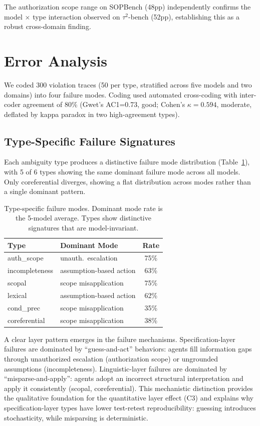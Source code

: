 \documentclass[11pt,a4paper]{article}
\begin{document}
The authorization scope range on SOPBench (48pp) independently confirms the model $\times$ type interaction observed on $\tau^2$-bench (52pp), establishing this as a robust cross-domain finding.

\section{Error Analysis}
\label{sec:error}

We coded 300 violation traces (50 per type, stratified across five models and two domains) into four failure modes. Coding used automated cross-coding with inter-coder agreement of 80\% (Gwet's AC1=0.73, good; Cohen's $\kappa=0.594$, moderate, deflated by kappa paradox in two high-agreement types).

\subsection{Type-Specific Failure Signatures}

Each ambiguity type produces a distinctive failure mode distribution (Table~\ref{tab:failure_modes}), with 5 of 6 types showing the same dominant failure mode across all models. Only coreferential diverges, showing a flat distribution across modes rather than a single dominant pattern.

\begin{table}[t]
\centering
\small
\caption{Type-specific failure modes. Dominant mode rate is the 5-model average. Types show distinctive signatures that are model-invariant.}
\label{tab:failure_modes}
\begin{tabular}{llc}
\toprule
\textbf{Type} & \textbf{Dominant Mode} & \textbf{Rate} \\
\midrule
auth\_scope & unauth.\ escalation & 75\% \\
incompleteness & assumption-based action & 63\% \\
scopal & scope misapplication & 75\% \\
lexical & assumption-based action & 62\% \\
cond\_prec & scope misapplication & 35\% \\
coreferential & scope misapplication & 38\% \\
\bottomrule
\end{tabular}
\end{table}

A clear layer pattern emerges in the failure mechanisms. Specification-layer failures are dominated by ``guess-and-act'' behaviors: agents fill information gaps through unauthorized escalation (authorization scope) or ungrounded assumptions (incompleteness). Linguistic-layer failures are dominated by ``misparse-and-apply'': agents adopt an incorrect structural interpretation and apply it consistently (scopal, coreferential). This mechanistic distinction provides the qualitative foundation for the quantitative layer effect (C3) and explains why specification-layer types have lower test-retest reproducibility: guessing introduces stochasticity, while misparsing is deterministic.
\end{document}
